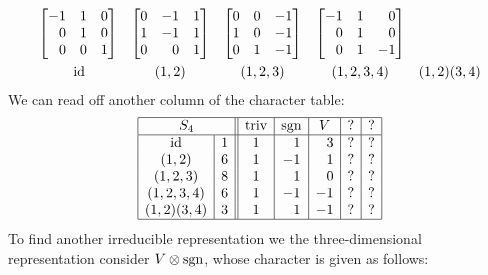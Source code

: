 \begin{example}
\[\begin{array}{ccccc}
\begin{bmatrix*}[r]
          -1  & 1 & 0 \\
           0  & 1 & 0 \\
           0  & 0 & 1
        \end{bmatrix*}
      & \begin{bmatrix*}[r]
          0 & -1  & 1 \\
          1 & -1  & 1 \\
          0 &  0  & 1
        \end{bmatrix*}
      & \begin{bmatrix*}[r]
          0 & 0 & -1  \\
          1 & 0 & -1  \\
          0 & 1 & -1
        \end{bmatrix*}
      & \begin{bmatrix*}[r]
          -1  & 1 &  0  \\
           0  & 1 &  0  \\
           0  & 1 & -1
        \end{bmatrix*}
      \\
        \rule{0pt}{1.2em}
        \id
      & (1,2)
      & (1,2,3)
      & (1,2,3,4)
      & (1,2)(3,4)
    \end{array}
  \]
  We can read off another column of the character table:
  \[
    \begin{array}{|c|c||c|c|c|c|c|}
      \hline
        \multicolumn{2}{|c||}{S_4}
      & \triv
      & \sgn
      & V
      & ?
      & ?
      \\
      \hline
        \id
      & 1
      &            1
      & \phantom{-}1
      & \phantom{-}3
      &            ?
      &            ?
      \\
        (1,2)
      & 6
      &            1
      &           -1
      & \phantom{-}1
      &            ?
      &            ?
      \\
        (1,2,3)
      & 8
      &            1
      & \phantom{-}1
      & \phantom{-}0
      &            ?
      &            ?
      \\
        (1,2,3,4)
      & 6
      &            1
      &           -1
      &           -1
      &            ?
      &            ?
      \\
        (1,2)(3,4)
      & 3
      &            1
      & \phantom{-}1
      &           -1
      &            ?
      &            ?
      \\
      \hline
    \end{array}
  \]
  To find another irreducible representation we the three-dimensional representation consider $V \mathbin{\otimes} \operatorname{sgn}$, whose character is given as follows:

\end{example}

